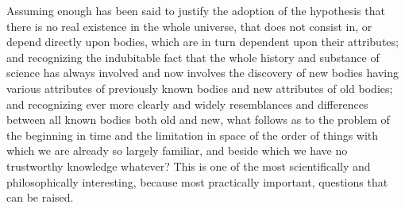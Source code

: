 \documentclass[a4paper, 11pt, oneside, polutonikogreek, english, landscape]{article}
\begin{document}
Assuming enough has been said to justify the adoption of the hypothesis that there is no real existence in the whole universe, that does not consist in, or depend directly upon bodies, which are in turn dependent upon their attributes; and recognizing the indubitable fact that the whole history and substance of science has always involved and now involves the discovery of new bodies having various attributes of previously known bodies and new attributes of old bodies; and recognizing ever more clearly and widely resemblances and differences between all known bodies both old and new, what follows as to the problem of the beginning in time and the limitation in space of the order of things with which we are already so largely familiar, and beside which we have no trustworthy knowledge whatever? This is one of the most scientifically and philosophically interesting, because most practically important, questions that can be raised.
\end{document}
